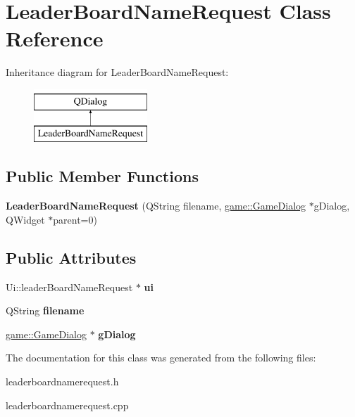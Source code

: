 \hypertarget{classLeaderBoardNameRequest}{}\section{Leader\+Board\+Name\+Request Class Reference}
\label{classLeaderBoardNameRequest}
Inheritance diagram for Leader\+Board\+Name\+Request\+:\begin{figure}[H]
\begin{center}
\leavevmode
\includegraphics[height=2.000000cm]{classLeaderBoardNameRequest}
\end{center}
\end{figure}
\subsection*{Public Member Functions}
\begin{DoxyCompactItemize}
\item 
\mbox{\label{classLeaderBoardNameRequest_a83512d43005fcfb7cdc737b99e1f8759}} 
{\bfseries Leader\+Board\+Name\+Request} (Q\+String filename, \hyperlink{classgame_1_1GameDialog}{game\+::\+Game\+Dialog} $\ast$g\+Dialog, Q\+Widget $\ast$parent=0)
\end{DoxyCompactItemize}
\subsection*{Public Attributes}
\begin{DoxyCompactItemize}
\item 
\mbox{\label{classLeaderBoardNameRequest_a9585af9622650e407cf80de992180d23}} 
Ui\+::leader\+Board\+Name\+Request $\ast$ {\bfseries ui}
\item 
\mbox{\label{classLeaderBoardNameRequest_afce5bd688f07e991a03ba05390fa787f}} 
Q\+String {\bfseries filename}
\item 
\mbox{\label{classLeaderBoardNameRequest_a3b14b1142491e1b98f9c7267b79a8c86}} 
\hyperlink{classgame_1_1GameDialog}{game\+::\+Game\+Dialog} $\ast$ {\bfseries g\+Dialog}
\end{DoxyCompactItemize}


The documentation for this class was generated from the following files\+:\begin{DoxyCompactItemize}
\item 
leaderboardnamerequest.\+h\item 
leaderboardnamerequest.\+cpp\end{DoxyCompactItemize}
